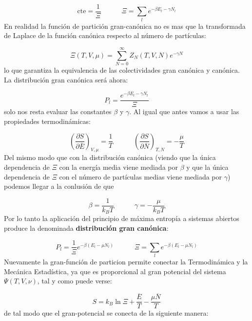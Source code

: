 \documentclass[12pt,a4paper]{article}
\numberwithin{equation}{section}
\numberwithin{figure}{section}
\newcommand{\tquad}{\quad \quad \quad}
\newcommand{\parentesis}[1]{\left( #1  \right)}
\newcommand{\parciales}[2]{\frac{\partial #1}{\partial #2}}
\newcommand{\cte}{\mathrm{cte}}
\theoremstyle{definition}
\begin{document}
\begin{equation}
\cte = \frac{1}{\Xi} \tquad \Xi = \sum_l e^{- \beta E_l - \gamma N_l}
\end{equation}
En realidad la función de partición gran-canónica no es mas que la transformada de Laplace de la función canónica respecto al número de partículas:

\begin{equation}
\Xi (T,V,\mu) = \sum_{N=0}^\infty Z_N (T,V,N) e^{- \gamma N}
\end{equation}
lo que garantiza la equivalencia de las colectividades gran canónica y canónica. La distribución gran canónica será ahora:

\begin{equation}
P_l = \frac{e^{-\beta E_l - \gamma N_l}}{\Xi}
\end{equation}
solo nos resta evaluar las constantes $\beta$ y $\gamma$. Al igual que antes vamos a usar las propiedades termodinámicas:

\begin{equation}
\parentesis{\parciales{S}{\bar{E}}}_{V,\mu} = \frac{1}{T} \tquad 
\parentesis{\parciales{S}{\bar{N}}}_{T,N} = - \frac{\mu}{T}
\end{equation}
Del mismo modo que con la distribución canónica (viendo que la única dependencia de $\Xi$ con la energía media viene mediada por $\beta$ y que la única dependencia de $\Xi$ con el número de partículas medias viene mediada por $\gamma$) podemos llegar a la conlusión de que

\begin{equation}
\beta = \frac{1}{k_B T} \tquad \gamma = - \frac{\mu}{k_B T}
\end{equation}
Por lo tanto la aplicación del principio de máxima entropía a sistemas abiertos produce la denominada \textbf{distribución gran canónica}:

\begin{equation}
P_l = \frac{1}{\Xi} e^{- \beta (E_l - \mu N_l)} \tquad
\Xi = \sum_l e^{- \beta (E_l - \mu N_l)}
\end{equation}
Nuevamente la gran-función de particion permite conectar la Termodinámica y la Mecánica Estadística, ya que es proporcional al gran potencial del sistema $\Psi (T,V,\nu)$, tal y como puede verse:

\begin{equation}
S = k_B \ln \Xi + \frac{\overline{E}}{T} - \frac{\mu \overline{N}}{T}
\end{equation}
de tal modo que el gran-potencial se conecta de la siguiente manera:
\end{document}
